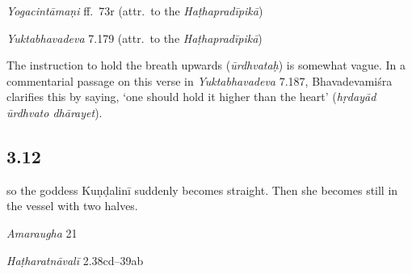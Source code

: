 \begin{ekdosis}
\begin{testimonia}[hp03_011]
\emph{Yogacintāmaṇi} ff.~73r (attr.~to the \emph{Haṭhapradīpikā})
\begin{versinnote}
\end{versinnote}

\emph{Yuktabhavadeva} 7.179 (attr.~to the \emph{Haṭhapradīpikā})
\begin{versinnote}
\end{versinnote}
\end{testimonia}

\begin{philcomm}[hp03_011]
The instruction to hold the breath upwards (\emph{ūrdhvataḥ}) is somewhat vague. In a commentarial passage on this verse in \emph{Yuktabhavadeva} 7.187, Bhavadevamiśra clarifies this by saying, `one should hold it higher than the heart' (\emph{hṛdayād ūrdhvato dhārayet}).
\end{philcomm}

\subsection*{3.12}
\begin{translation}[hp03_012]
[\dots] so the goddess Kuṇḍalinī suddenly becomes straight. Then she becomes still in the vessel with two halves.
\end{translation}

\begin{sources}[hp03_012]
\emph{Amaraugha} 21
\begin{versinnote}
\end{versinnote}
\end{sources}

\begin{testimonia}[hp03_012]
\emph{Haṭharatnāvalī} 2.38cd–39ab
\begin{versinnote}
\end{versinnote}


\end{testimonia}
\end{ekdosis}
